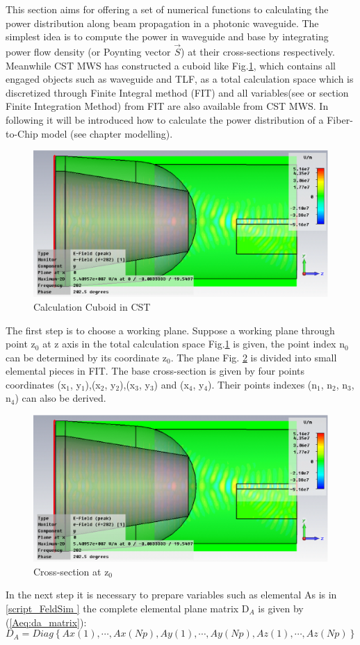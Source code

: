 
This section aims for offering a set of numerical functions to calculating the power distribution along beam propagation in a photonic waveguide. The simplest idea is to compute the power in waveguide and base by integrating power flow density (or Poynting vector $\vec{S}$) at their cross-sections respectively. Meanwhile CST MWS has constructed a cuboid like Fig.\quad\ref{Afig:app_power_distribution01}, which contains all engaged objects such as waveguide and TLF, as a total calculation space which is discretized through Finite Integral method (FIT) and all variables(see \cite{script_FeldSim} or section Finite Integration Method) from FIT are also available from CST MWS. In following it will be introduced how to calculate the power distribution of a Fiber-to-Chip model (see chapter modelling). 
\begin{figure}[ht]
\centering
\includegraphics[width=0.5 \textwidth]{bilder/basic_waveguide_efield}
\caption{Calculation Cuboid in CST}
\label{Afig:app_power_distribution01}
\end{figure}
The first step is to choose a working plane. Suppose a working plane through point z$_{0}$ at z axis in the total calculation space Fig.\quad\ref{Afig:app_power_distribution01} is given, the point index n$_{0}$ can be determined by its coordinate z$_{0}$. The plane Fig. \quad\ref{Afig:app_power_distribution02}  is divided into small elemental pieces in FIT. The base cross-section is given by four points coordinates (x$_{1}$, y$_{1}$),(x$_{2}$, y$_{2}$),(x$_{3}$, y$_{3}$) and (x$_{4}$, y$_{4}$). Their points indexes (n$_{1}$, n$_{2}$, n$_{3}$, n$_{4}$) can also be derived.    
\begin{figure}[ht]
\centering
\includegraphics[width=0.5 \textwidth]{bilder/basic_waveguide_efield}
\caption{Cross-section at z$_{0}$}
\label{Afig:app_power_distribution02}
\end{figure}
In the next step it is necessary to prepare variables such as elemental 
As is in \ref{script_FeldSim } the complete elemental plane matrix D$_{A}$ is given by (\ref{Aeq:da_matrix}): 
\begin{equation}
D_{A}=Diag\left\{Ax(1),\cdots,Ax(Np),Ay(1),\cdots,Ay(Np), Az(1),\cdots,Az(Np)\right\}
\label{Aeq:da_matrix}
\end{equation}

